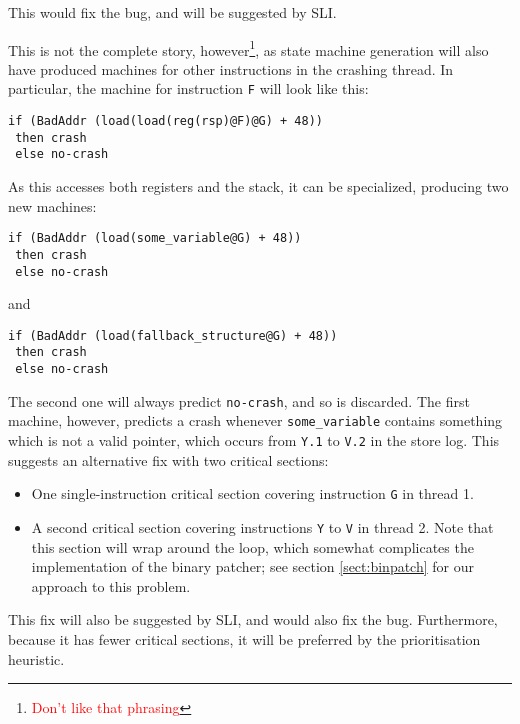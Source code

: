 \documentclass[10pt,twocolumn,preprint,natbib,authoryear]{sigplanconf}
\newcommand{\editorial}[1]{\textcolor{red}{\footnote{\textcolor{red}{#1}}}}
\begin{document}
This would fix the bug, and will be suggested by SLI.

This is not the complete story, however\editorial{Don't like that
  phrasing}, as state machine generation will also have produced
machines for other instructions in the crashing thread.  In particular,
the machine for instruction \verb|F| will look like this:

\begin{verbatim}
if (BadAddr (load(load(reg(rsp)@F)@G) + 48))
 then crash
 else no-crash
\end{verbatim}

As this accesses both registers and the stack, it can be specialized,
producing two new machines:

\begin{verbatim}
if (BadAddr (load(some_variable@G) + 48))
 then crash
 else no-crash
\end{verbatim}

and

\begin{verbatim}
if (BadAddr (load(fallback_structure@G) + 48))
 then crash
 else no-crash
\end{verbatim}

The second one will always predict \verb|no-crash|, and so is
discarded.  The first machine, however, predicts a crash whenever
\verb|some_variable| contains something which is not a valid pointer,
which occurs from \verb|Y.1| to \verb|V.2| in the store log.  This
suggests an alternative fix with two critical sections:

\begin{itemize}
\item One single-instruction critical section covering instruction
  \verb|G| in thread 1.
\item A second critical section covering instructions \verb|Y| to
  \verb|V| in thread 2.  Note that this section will wrap around the
  loop, which somewhat complicates the implementation of the binary
  patcher; see section \ref{sect:binpatch} for our approach to this
  problem.
\end{itemize}

This fix will also be suggested by SLI, and would also fix the bug.
Furthermore, because it has fewer critical sections, it will be
preferred by the prioritisation heuristic.
\end{document}
